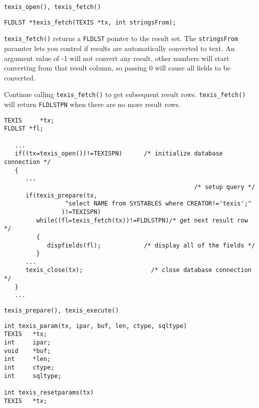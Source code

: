 \SEE
\begin{verbatim}
texis_open(), texis_fetch()
\end{verbatim}


\SYNOPSIS
\begin{verbatim}
FLDLST *texis_fetch(TEXIS *tx, int stringsFrom);
\end{verbatim}

\DESCRIPTION

\verb`texis_fetch()` returns a \verb`FLDLST` pointer to the result
set.  The \verb`stringsFrom` paramter lets you control if results are
automatically converted to text.  An argument value of -1 will not
convert any result, other numbers will start converting from that result
column, so passing 0 will cause all fields to be converted.

Continue calling \verb`texis_fetch()` to get subsequent result rows.
\verb`texis_fetch()` will return \verb`FLDLSTPN` when there are no more
result rows.

\EXAMPLE
\begin{verbatim}
TEXIS     *tx;
FLDLST *fl;

   ...
   if((tx=texis_open())!=TEXISPN)      /* initialize database connection */
   {
      ...
                                                     /* setup query */
      if(texis_prepare(tx,
                 "select NAME from SYSTABLES where CREATOR!='texis';"
                )!=TEXISPN)
         while((fl=texis_fetch(tx))!=FLDLSTPN)/* get next result row */
         {
            dispfields(fl);            /* display all of the fields */
         }
      ...
      texis_close(tx);                   /* close database connection */
   }
   ...
\end{verbatim}

\SEE
\begin{verbatim}
texis_prepare(), texis_execute()
\end{verbatim}


\SYNOPSIS
\begin{verbatim}
int texis_param(tx, ipar, buf, len, ctype, sqltype)
TEXIS   *tx;
int     ipar;
void    *buf;
int     *len;
int     ctype;
int     sqltype;

int texis_resetparams(tx)
TEXIS	*tx;
\end{verbatim}

